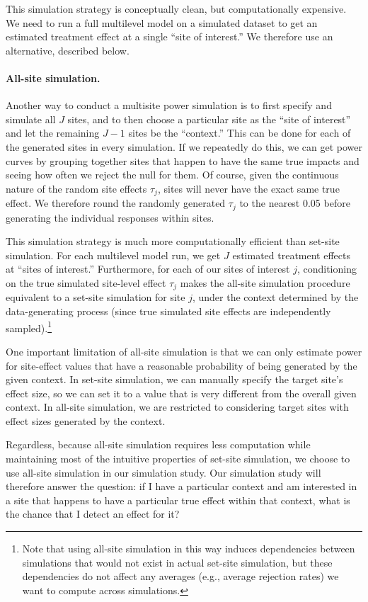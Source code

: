\documentclass[]{article}
\begin{document}
This simulation strategy is conceptually clean, but computationally expensive.
We need to run a full multilevel model on a simulated dataset to get an estimated treatment effect at a single ``site of interest.''
We therefore use an alternative, described below.

\paragraph{All-site simulation.} Another way to conduct a multisite power simulation is to first specify and simulate all $J$ sites, and to then choose a particular site as the ``site of interest'' and let the remaining $J-1$ sites be the ``context.''
This can be done for each of the generated sites in every simulation.
If we repeatedly do this, we can get power curves by grouping together sites that happen to have the same true impacts and seeing how often we reject the null for them.
Of course, given the continuous nature of the random site effects $\tau_j$, sites will never have the exact same true effect.
We therefore round the randomly generated $\tau_j$ to the nearest 0.05 before generating the individual responses within sites.

This simulation strategy is much more computationally efficient than set-site simulation.
For each multilevel model run, we get $J$ estimated treatment effects at ``sites of interest.''
Furthermore, for each of our sites of interest $j$, conditioning on the true simulated site-level effect $\tau_j$ makes the all-site simulation procedure equivalent to a set-site simulation for site $j$, under the context determined by the data-generating process (since true simulated site effects are independently sampled).\footnote{Note that using all-site simulation in this way induces dependencies between simulations that would not exist in actual set-site simulation, but these dependencies do not affect any averages (e.g., average rejection rates) we want to compute across simulations.}

One important limitation of all-site simulation is that we can only estimate power for site-effect values that have a reasonable probability of being generated by the given context.
In set-site simulation, we can manually specify the target site's effect size, so we can set it to a value that is very different from the overall given context.
In all-site simulation, we are restricted to considering target sites with effect sizes generated by the context.

Regardless, because all-site simulation requires less computation while maintaining most of the intuitive properties of set-site simulation, we choose to use all-site simulation in our simulation study.
Our simulation study will therefore answer the question: if I have a particular context and am interested in a site that happens to have a particular true effect within that context, what is the chance that I detect an effect for it?
\end{document}
